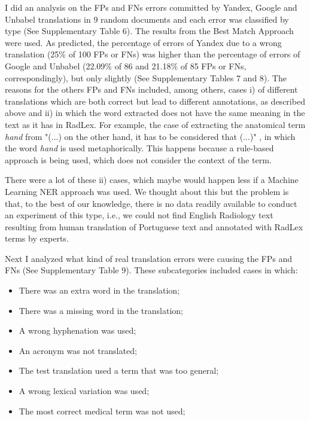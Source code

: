I did an analysis on the FPs and FNs errors committed by Yandex, Google and Unbabel translations in 9 random documents and each error was classified by type (See Supplementary Table 6). The results from the Best Match Approach were used. As predicted, the percentage of errors of Yandex due to a wrong translation (25\% of 100 FPs or FNs) was higher than the percentage of errors of Google and Unbabel (22.09\% of 86 and 21.18\% of 85 FPs or FNs, correspondingly), but only slightly (See Supplementary Tables 7 and 8). The reasons for the others FPs and FNs included, among others, cases i) of different translations which are both correct but lead to different annotations, as described above and ii) in which the word extracted does not have the same meaning in the text as it has in RadLex. For example, the case of extracting the anatomical term \textit{hand} from "(...) on the other hand, it has to be considered that (...)" , in which the word \textit{hand} is used metaphorically. This happens because a rule-based approach is being used, which does not consider the context of the term. 

There were a lot of these ii) cases, which maybe would happen less if a Machine Learning NER approach was used. We thought about this but the problem is that, to the best of our knowledge, there is no data  readily available to conduct an experiment of this type, i.e., we could not find English Radiology text resulting from human translation of Portuguese text and annotated with RadLex terms by experts. 

Next I analyzed what kind of real translation errors were causing the FPs and FNs (See Supplementary Table 9). These subcategories included cases in which:

\begin{itemize}
	\item There was an extra word in the translation;
	\item There was a missing word in the translation;
	\item A wrong hyphenation was used;
	\item An acronym was not translated; 
	\item The test translation used a term that was too general;
	\item A wrong lexical variation was used;
	\item The most correct medical term was not used;
\end{itemize}

